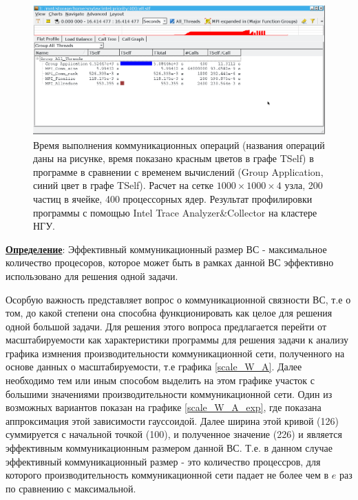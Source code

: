 \begin{figure}[h]
	\begin{center}
		\includegraphics[height=5cm,keepaspectratio]{images/scalingNSU-img20.png}
		\caption{
			Время выполнения коммуникационных операций (названия операций даны на рисунке, время показано красным цветов в графе TSelf) в программе в сравнении с временем вычислений (Group Application, синий цвет в графе TSelf). Расчет на сетке $1000  \times 1000 \times 4$ узла, 200 частиц в ячейке, 400 процессорных ядер. Результат профилировки программы с помощью Intel Trace Analyzer\&Collector на кластере НГУ.
		}
		\label{scale9a}
	\end{center} 
\end{figure}	    

 \underline{\textbf{Определение}}: Эффективный коммуникационный размер ВС - максимальное количество процесоров, которое может быть в рамках данной ВС эффективно использовано для решения одной задачи.  
 
 
 
 Осорбую важность представляет вопрос о коммуникационной связности ВС, т.е о том, до какой степени она способна функционировать как целое для решения одной большой задачи. Для решения этого вопроса предлагается перейти от масштабируемости как характеристики программы для решения задачи к анализу графика измнения производительности коммуникационной сети, полученного на основе данных о масштабируемости, т.е графика \ref{scale_W_A}. Далее необходимо тем или иным способом выделить на этом графике участок с большими значениями производительности коммуникационной сети.
 Один из возможных вариантов показан на графике \ref{scale_W_A_exp}, где показана аппроксимация этой зависимости гауссоидой. Далее ширина этой кривой (126) суммируется с начальной точкой (100), и полученное значение (226) и является эффективным коммуникационным размером данной ВС. Т.е. в данном случае эффективный коммуникационный размер - это количество процессров, для которого производительность коммуникационной сети падает не более чем в $e$ раз по сравнению с максимальной.


